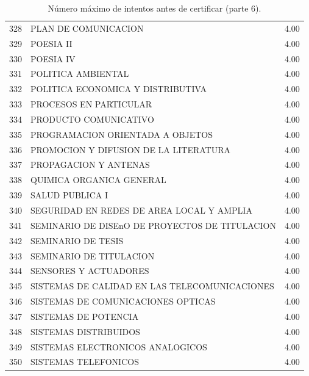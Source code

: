 \documentclass[12pt]{article}
\begin{document}
\begin{table}[ht]
{\begin{tabular}{rlr}
  328 & PLAN DE COMUNICACION & 4.00 \\ 
  329 & POESIA II & 4.00 \\ 
  330 & POESIA IV & 4.00 \\ 
  331 & POLITICA AMBIENTAL & 4.00 \\ 
  332 & POLITICA ECONOMICA Y DISTRIBUTIVA & 4.00 \\ 
  333 & PROCESOS EN PARTICULAR & 4.00 \\ 
  334 & PRODUCTO COMUNICATIVO & 4.00 \\ 
  335 & PROGRAMACION ORIENTADA A OBJETOS  & 4.00 \\ 
  336 & PROMOCION Y DIFUSION DE LA LITERATURA & 4.00 \\ 
  337 & PROPAGACION Y ANTENAS & 4.00 \\ 
  338 & QUIMICA ORGANICA GENERAL & 4.00 \\ 
  339 & SALUD PUBLICA I & 4.00 \\ 
  340 & SEGURIDAD EN REDES DE AREA LOCAL Y AMPLIA & 4.00 \\ 
  341 & SEMINARIO DE DISEnO DE PROYECTOS DE TITULACION & 4.00 \\ 
  342 & SEMINARIO DE TESIS & 4.00 \\ 
  343 & SEMINARIO DE TITULACION & 4.00 \\ 
  344 & SENSORES Y ACTUADORES & 4.00 \\ 
  345 & SISTEMAS DE CALIDAD EN LAS TELECOMUNICACIONES & 4.00 \\ 
  346 & SISTEMAS DE COMUNICACIONES OPTICAS & 4.00 \\ 
  347 & SISTEMAS DE POTENCIA & 4.00 \\ 
  348 & SISTEMAS DISTRIBUIDOS & 4.00 \\ 
  349 & SISTEMAS ELECTRONICOS ANALOGICOS & 4.00 \\ 
  350 & SISTEMAS TELEFONICOS & 4.00 \\ 
   \hline
\end{tabular}
}
\caption{\label{Num_Max_Intentos_Cert_6} N\'umero m\'aximo de intentos antes de certificar (parte 6).}

\end{table}
\end{document}
